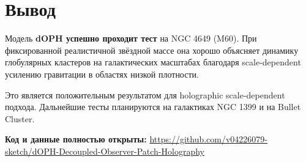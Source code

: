 \documentclass[12pt,a4paper]{article}
\begin{document}
\section{Вывод}

Модель \textbf{dOPH успешно проходит тест} на NGC 4649 (M60). При фиксированной реалистичной звёздной массе она хорошо объясняет динамику глобулярных кластеров на галактических масштабах благодаря scale-dependent усилению гравитации в областях низкой плотности.

Это является положительным результатом для holographic scale-dependent подхода. Дальнейшие тесты планируются на галактиках NGC 1399 и на Bullet Cluster.

\bigskip
\textbf{Код и данные полностью открыты:} \url{https://github.com/v04226079-sketch/dOPH-Decoupled-Observer-Patch-Holography}
\end{document}
